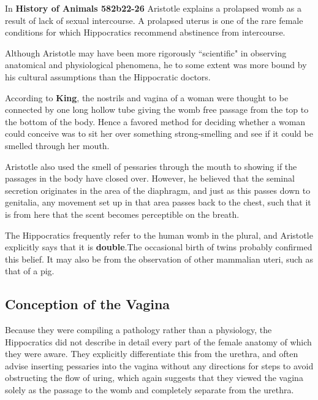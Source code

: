 \begin{rmk}
    In \textbf{History of Animals 582b22-26} Aristotle explains a prolapsed womb as a result of lack of sexual intercourse. A prolapsed uterus is one of the rare female conditions for which Hippocratics recommend abstinence from intercourse. 
\end{rmk}

Although Aristotle may have been more rigorously ``scientific" in observing anatomical and physiological phenomena, he to some extent was more bound by his cultural assumptions than the Hippocratic doctors.

According to \textbf{King}, the nostrils and vagina of a woman were thought to be connected by one long hollow tube giving the womb free passage from the top to the bottom of the body. Hence a favored method for deciding whether a woman could conceive was to sit her over something strong-smelling and see if it could be smelled through her mouth.

Aristotle also used the smell of pessaries through the mouth to showing if the passages in the body have closed over. However, he believed that the seminal secretion originates in the area of the diaphragm, and just as this passes down to genitalia, any movement set up in that area passes back to the chest, such that it is from here that the scent becomes perceptible on the breath.

\begin{nte}
    The Hippocratics frequently refer to the human womb in the plural, and Aristotle explicitly says that it is \textbf{double}.The occasional birth of twins probably confirmed this belief. It may also be from the observation of other mammalian uteri, such as that of a pig.
\end{nte}

\subsection{Conception of the Vagina}

Because they were compiling a pathology rather than a physiology, the Hippocratics did not describe in detail every part of the female anatomy of which they were aware. They explicitly differentiate this from the urethra, and often advise inserting pessaries into the vagina without any directions for steps to avoid obstructing the flow of uring, which again suggests that they viewed the vagina solely as the passage to the womb and completely separate from the urethra.

